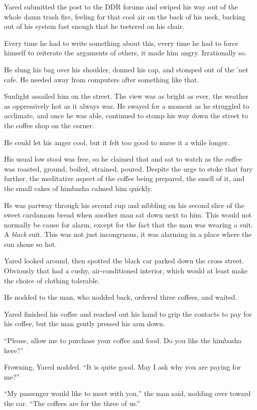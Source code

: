 Yared submitted the post to the DDR forums and swiped his way out of the whole damn trash fire, feeling for that cool air on the back of his neck, backing out of his system fast enough that he teetered on his chair.

Every time he had to write something about this, every time he had to force himself to reiterate the arguments of others, it made him angry. Irrationally so.

He slung his bag over his shoulder, donned his cap, and stomped out of the 'net cafe. He needed away from computers after something like that.

Sunlight assailed him on the street. The view was as bright as ever, the weather as oppressively hot as it always was. He swayed for a moment as he struggled to acclimate, and once he was able, continued to stomp his way down the street to the coffee shop on the corner.

He could let his anger cool, but it felt too good to nurse it a while longer.

His usual low stool was free, so he claimed that and sat to watch as the coffee was roasted, ground, boiled, strained, poured. Despite the urge to stoke that fury further, the meditative aspect of the coffee being prepared, the smell of it, and the small cakes of himbasha calmed him quickly.

He was partway through his second cup and nibbling on his second slice of the sweet cardamom bread when another man sat down next to him. This would not normally be cause for alarm, except for the fact that the man was wearing a suit. A \emph{black} suit. This was not just incongruous, it was alarming in a place where the sun shone so hot.

Yared looked around, then spotted the black car parked down the cross street. Obviously that had a cushy, air-conditioned interior, which would at least make the choice of clothing tolerable.

He nodded to the man, who nodded back, ordered three coffees, and waited.

Yared finished his coffee and reached out his hand to grip the contacts to pay for his coffee, but the man gently pressed his arm down.

``Please, allow me to purchase your coffee and food. Do you like the himbasha here?''

Frowning, Yared nodded. ``It is quite good. May I ask why you are paying for me?''

``My passenger would like to meet with you,'' the man said, nodding over toward the car. ``The coffees are for the three of us.''

